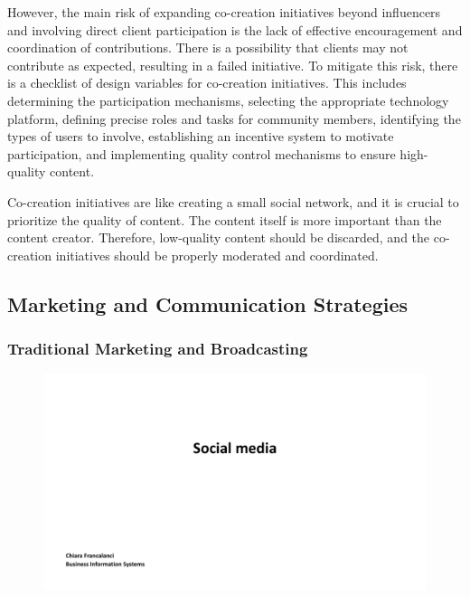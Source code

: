 However, the main risk of expanding co-creation initiatives beyond
influencers and involving direct client participation is the lack of
effective encouragement and coordination of contributions. There is a
possibility that clients may not contribute as expected, resulting in a
failed initiative. To mitigate this risk, there is a checklist of design
variables for co-creation initiatives. This includes determining the
participation mechanisms, selecting the appropriate technology platform,
defining precise roles and tasks for community members, identifying the
types of users to involve, establishing an incentive system to motivate
participation, and implementing quality control mechanisms to ensure
high-quality content.

Co-creation initiatives are like creating a small social network, and it
is crucial to prioritize the quality of content. The content itself is
more important than the content creator. Therefore, low-quality content
should be discarded, and the co-creation initiatives should be properly
moderated and coordinated.

\subsection{Marketing and Communication
  Strategies}\label{marketing-and-communication-strategies}

\subsubsection{Traditional Marketing and
  Broadcasting}\label{traditional-marketing-and-broadcasting}

\begin{figure}[!h]
  \centering
  \includegraphics[page=17, trim = 1.5cm 5cm 2.5cm 3cm, clip, width=\imagewidth]{images/04 - Social_Media.pdf}
\end{figure}


